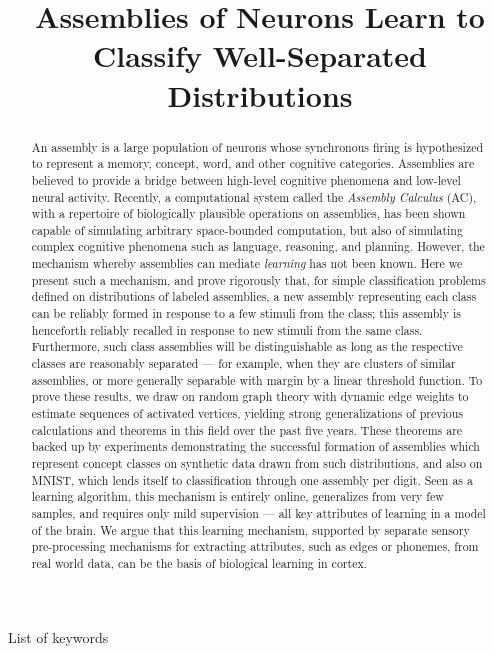 \documentclass[final,12pt]{colt2022} %
\title[Learning with Assemblies of Neurons]{Assemblies of Neurons Learn to Classify Well-Separated Distributions}
\begin{document}
\maketitle

\begin{abstract}%
    \noindent An assembly is a large population of neurons whose synchronous firing is hypothesized to represent a memory, concept, word, and other cognitive categories.  Assemblies are believed to provide a bridge between high-level cognitive phenomena and low-level neural activity. Recently, a computational system called the \emph{Assembly Calculus} (AC), with a repertoire of biologically plausible operations on assemblies, has been shown capable of simulating arbitrary space-bounded computation, but also of simulating complex cognitive phenomena such as language, reasoning, and planning.  However, the mechanism whereby assemblies can mediate {\em learning} has not been known.  Here we present such a mechanism, and prove rigorously that, for simple classification problems defined on distributions of labeled assemblies, a new assembly representing each class can be reliably formed in response to a few stimuli from the class; this assembly is henceforth reliably recalled in response to new stimuli from the same class.  Furthermore, such class assemblies will be distinguishable as long as the respective classes are reasonably separated --- for example, when they are clusters of similar assemblies, or more generally separable with margin by a linear threshold function. To prove these results, we draw on random graph theory with dynamic edge weights to estimate sequences of activated vertices, yielding strong generalizations of previous calculations and theorems in this field over the past five years. These theorems are backed up by experiments demonstrating the successful formation of assemblies which represent concept classes on synthetic data drawn from such distributions, and also on MNIST, which lends itself to classification through one assembly per digit. Seen as a learning algorithm, this mechanism is entirely online, generalizes from very few samples, and requires only mild supervision --- all key attributes of learning in a model of the brain.  We argue that this learning mechanism, supported by separate sensory pre-processing mechanisms for extracting attributes, such as edges or phonemes, from real world data, can be the basis of biological learning in cortex. 
\end{abstract}

\begin{keywords}%
  List of keywords%
\end{keywords}
\end{document}
